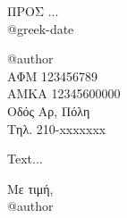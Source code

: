 \documentclass[a4paper,11pt]{article}
\title{}
\author{@{author}}
\date{\today}
\begin{document}
\noindent{}ΠΡΟΣ ...\\
@{greek-date}

\noindent{}@{author}\\
ΑΦΜ 123456789\\
ΑΜΚΑ 12345600000\\
Οδός Αρ, Πόλη\\
Τηλ. 210-xxxxxxx

Text...

\begin{flushright}
Με τιμή,\\
@{author}
\end{flushright}
\end{document}
